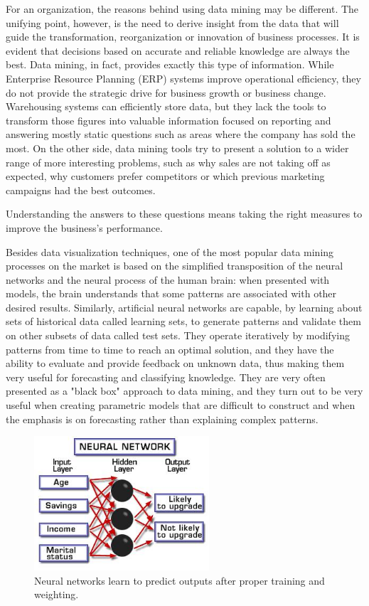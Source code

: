 For an organization, the reasons behind using data mining may be different.
The unifying point, however, is the need to derive insight from the data that will guide the transformation, reorganization or innovation of business processes.
It is evident that decisions based on accurate and reliable knowledge are always the best. Data mining, in fact, provides exactly this type of information.
While Enterprise Resource Planning (ERP) systems improve operational efficiency, they do not provide the strategic drive for business growth or business change. Warehousing systems can efficiently store data, but they lack the tools to transform those figures into valuable information focused on reporting and answering mostly static questions such as areas where the company has sold the most. On the other side, data mining tools try to present a solution to a wider range of more interesting problems, such as why sales are not taking off as expected, why customers prefer competitors or which previous marketing campaigns had the best outcomes.

Understanding the answers to these questions means taking the right measures to improve the business’s performance.

Besides data visualization techniques, one of the most popular data mining processes on the market is based on the simplified transposition of the neural networks and the neural process of the human brain: when presented with models, the brain understands that some patterns are associated with other desired results. Similarly, artificial neural networks are capable, by learning about sets of historical data called learning sets, to generate patterns and validate them on other subsets of data called test sets. They operate iteratively by modifying patterns from time to time to reach an optimal solution, and they have the ability to evaluate and provide feedback on unknown data, thus making them very useful for forecasting and classifying knowledge. They are very often presented as a "black box" approach to data mining, and they turn out to be very useful when creating parametric models that are difficult to construct and when the emphasis is on forecasting rather than explaining complex patterns.


\vspace{0.5cm}
\begin{figure}[htbp]
  \centering
    \includegraphics[height=5cm]{images/neural}
  \caption{Neural networks learn to predict outputs after proper training and weighting.}
  \label{fig:neural}
\end{figure}
\vspace{0.5cm}

